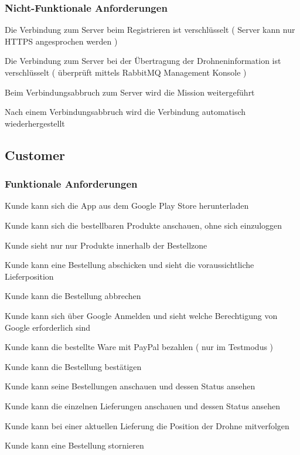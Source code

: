 \subsubsection{Nicht-Funktionale Anforderungen}
\begin{todolist}
	\item Die Verbindung zum Server beim Registrieren ist verschlüsselt ( Server kann nur HTTPS angesprochen werden )
	\item Die Verbindung zum Server bei der Übertragung der Drohneninformation ist verschlüsselt ( überprüft mittels RabbitMQ Management Konsole )
	\item[\done] Beim Verbindungsabbruch zum Server wird die Mission weitergeführt
	\item[\done] Nach einem Verbindungsabbruch wird die Verbindung automatisch wiederhergestellt
\end{todolist}

\subsection{Customer}
\subsubsection{Funktionale Anforderungen}
\begin{todolist}
	\item Kunde kann sich die App aus dem Google Play Store herunterladen 
	\item Kunde kann sich die bestellbaren Produkte anschauen, ohne sich einzuloggen
	\item Kunde sieht nur nur Produkte innerhalb der Bestellzone
	\item Kunde kann eine Bestellung abschicken und sieht die voraussichtliche Lieferposition
	\item Kunde kann die Bestellung abbrechen
	\item Kunde kann sich über Google Anmelden und sieht welche Berechtigung von Google erforderlich sind
	\item Kunde kann die bestellte Ware mit PayPal bezahlen ( nur im Testmodus )
	\item Kunde kann die Bestellung bestätigen
	\item Kunde kann seine Bestellungen anschauen und dessen Status ansehen
	\item Kunde kann die einzelnen Lieferungen anschauen und dessen Status ansehen
	\item Kunde kann bei einer aktuellen Lieferung die Position der Drohne mitverfolgen
	\item Kunde kann eine Bestellung stornieren
\end{todolist}

